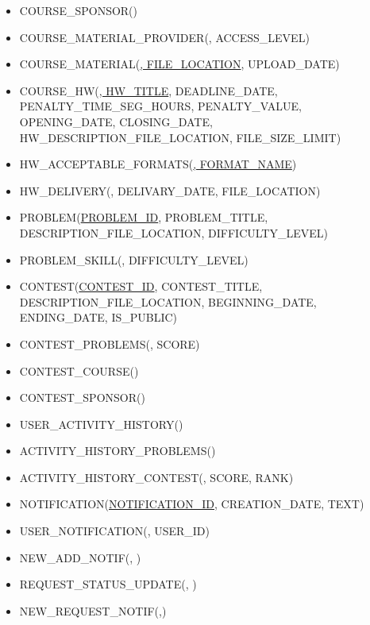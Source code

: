 \documentclass{article}
\begin{document}
\begin{flushleft}
\begin{latin}
\begin{itemize}
            \item COURSE\_SPONSOR(\underline{})
            \item COURSE\_MATERIAL\_PROVIDER(\underline{}, ACCESS\_LEVEL)
            \item COURSE\_MATERIAL(\underline{, FILE\_LOCATION}, UPLOAD\_DATE)
            \item COURSE\_HW(\underline{, HW\_TITLE}, DEADLINE\_DATE, PENALTY\_TIME\_SEG\_HOURS, PENALTY\_VALUE, OPENING\_DATE, CLOSING\_DATE, HW\_DESCRIPTION\_FILE\_LOCATION, FILE\_SIZE\_LIMIT)
            \item HW\_ACCEPTABLE\_FORMATS(\underline{, FORMAT\_NAME})
            \item HW\_DELIVERY(\underline{}, DELIVARY\_DATE, FILE\_LOCATION)
            \item PROBLEM(\underline{PROBLEM\_ID}, PROBLEM\_TITLE, DESCRIPTION\_FILE\_LOCATION, DIFFICULTY\_LEVEL)
            \item PROBLEM\_SKILL(\underline{}, DIFFICULTY\_LEVEL)
            \item CONTEST(\underline{CONTEST\_ID}, CONTEST\_TITLE, DESCRIPTION\_FILE\_LOCATION, BEGINNING\_DATE, ENDING\_DATE, IS\_PUBLIC)
            \item CONTEST\_PROBLEMS(\underline{}, SCORE)
            \item CONTEST\_COURSE(\underline{})
            \item CONTEST\_SPONSOR(\underline{})
            \item USER\_ACTIVITY\_HISTORY(\underline{})
            \item ACTIVITY\_HISTORY\_PROBLEMS(\underline{})
            \item ACTIVITY\_HISTORY\_CONTEST(\underline{}, SCORE, RANK)
            \item NOTIFICATION(\underline{NOTIFICATION\_ID}, CREATION\_DATE, TEXT)
            \item USER\_NOTIFICATION(\underline{}, USER\_ID)
            \item NEW\_ADD\_NOTIF(\underline{}, )
            \item REQUEST\_STATUS\_UPDATE(\underline{}, )
            \item NEW\_REQUEST\_NOTIF(\underline{},)
        \end{itemize}
    \end{latin}
\end{flushleft}
\end{document}

